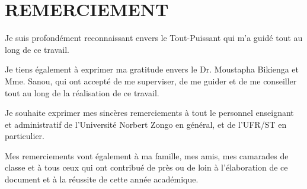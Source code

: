 \chapter*{REMERCIEMENT}
\thispagestyle{MyStyle}

Je suis profondément reconnaissant envers le Tout-Puissant qui m'a guidé tout au long de ce travail.\par
\vspace{0.3cm}
Je tiens également à exprimer ma gratitude envers le Dr. Moustapha Bikienga et Mme. Sanou, qui ont accepté de me superviser, de me guider et de me conseiller tout au long de la réalisation de ce travail.\par
\vspace{0.3cm}
Je souhaite exprimer mes sincères remerciements à tout le personnel enseignant et administratif de l'Université Norbert Zongo en général, et de l'UFR/ST en particulier.\par
\vspace{0.3cm}
Mes remerciements vont également à ma famille, mes amis, mes camarades de classe et à tous ceux qui ont contribué de près ou de loin à l'élaboration de ce document et à la réussite de cette année académique.